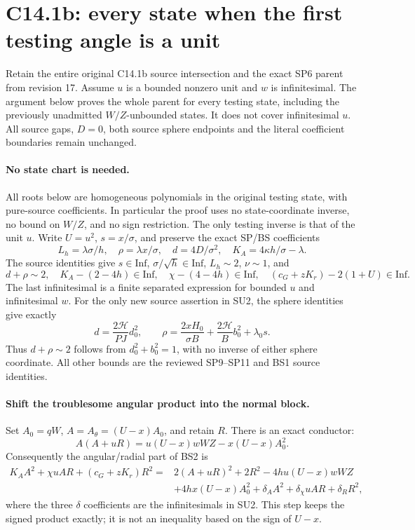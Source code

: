 \section{C14.1b: every state when the first testing angle is a unit}
\label{sec:r18-sphere-unit-u}

Retain the entire original C14.1b source intersection and the exact
SP6 parent from revision 17.  Assume $u$ is a bounded nonzero unit
and $w$ is infinitesimal.  The argument below proves the whole parent
for every testing state, including the previously unadmitted
$W/Z$-unbounded states.  It does not cover infinitesimal $u$.
All source gaps, $D=0$, both source sphere endpoints and the literal
coefficient boundaries remain unchanged.

\paragraph{No state chart is needed.}
All roots below are homogeneous polynomials in the original testing
state, with pure-source coefficients.  In particular the proof
uses no state-coordinate inverse, no bound on $W/Z$, and no sign
restriction.  The only testing inverse is that of the unit $u$.
Write $U=u^2$, $s=x/\sigma$, and preserve the exact SP/BS coefficients
\[
 L_h=\lambda\sigma/h,\quad \rho=\lambda x/\sigma,
 \quad d=4D/\sigma^2,\quad K_A=4\kappa h/\sigma-\lambda.
\]
The source identities give $s\in\mathrm{Inf}$,
$\sigma/\sqrt h\in\mathrm{Inf}$, $L_h\sim2$, $\nu\sim1$, and
\[
 d+\rho\sim2,\quad K_A-(2-4h)\in\mathrm{Inf},\quad
 \chi-(4-4h)\in\mathrm{Inf},\quad
 (c_G+zK_r)-2(1+U)\in\mathrm{Inf}.
 \tag{SU2}
\]
The last infinitesimal is a finite separated expression for bounded
$u$ and infinitesimal $w$.  For the only new source assertion in
SU2, the sphere identities give exactly
\[
 d=\frac{2\mathcal H}{PJ}d_0^2,\qquad
 \rho=\frac{2xH_0}{\sigma B}
       +\frac{2\mathcal H}{B}b_0^2+\lambda_0s.
 \tag{SU3}
\]
Thus $d+\rho\sim2$ follows from $d_0^2+b_0^2=1$, with no inverse
of either sphere coordinate.  All other bounds are the reviewed
SP9--SP11 and BS1 source identities.

\paragraph{Shift the troublesome angular product into the normal block.}
Set $A_0=qW$, $A=A_\theta=(U-x)A_0$, and retain $R$.
There is an exact conductor:
\[
 A(A+uR)=u(U-x)wWZ-x(U-x)A_0^2.
 \tag{SU4}
\]
Consequently the angular/radial part of BS2 is
\[
\begin{split}
 K_AA^2+\chi uAR+(c_G+zK_r)R^2
 ={}&2(A+uR)^2+2R^2-4hu(U-x)wWZ\\
 &+4hx(U-x)A_0^2+\delta_A A^2+
   \delta_\chi uAR+\delta_RR^2,
\end{split} \tag{SU5}
\]
where the three $\delta$ coefficients are the infinitesimals in
SU2.  This step keeps the signed product exactly; it is not an
inequality based on the sign of $U-x$.

